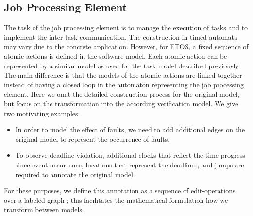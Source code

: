 \documentclass[10pt, a4paper, onecolumn, conference, compsocconf]{IEEEtran}
\begin{document}
\subsection{Job Processing Element\label{sec.Job.Processing.Element}}
The task of the job processing element is to manage the execution of tasks and to implement the inter-task communication. The construction in timed automata may vary due to the concrete application. However, for FTOS, a fixed sequence of atomic actions is defined in the software model. Each atomic action can be represented by a similar model as used for the task model described previously. The main difference is that the models of the atomic actions are linked together instead of having a closed loop in the automaton representing the job processing element. Here we omit the detailed construction process for the original model, but focus on the transformation into the according verification model. We give two motivating examples.

\begin{itemize}
    \item In order to model the effect of faults, we need to add additional edges on the original model to represent the occurrence of faults.
    \item To observe deadline violation, additional clocks that reflect the time progress since event occurrence, locations that represent the deadlines, and jumps are required to annotate the original model.
\end{itemize}

For these purposes, we define this annotation as a sequence of edit-operations over a labeled graph \cite{wang2008prs}; this facilitates the mathematical formulation how we transform between models.
\end{document}
